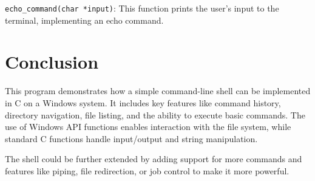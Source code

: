 \documentclass{article}
\begin{document}
\texttt{echo\_command(char *input)}: This function prints the user's input to the terminal, implementing an echo command.

\section{Conclusion}

This program demonstrates how a simple command-line shell can be implemented in C on a Windows system. It includes key features like command history, directory navigation, file listing, and the ability to execute basic commands. The use of Windows API functions enables interaction with the file system, while standard C functions handle input/output and string manipulation.

The shell could be further extended by adding support for more commands and features like piping, file redirection, or job control to make it more powerful.
\end{document}
